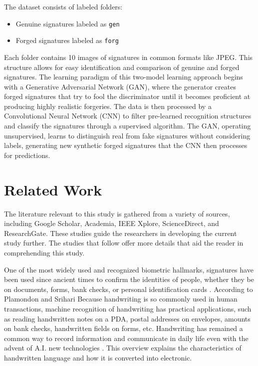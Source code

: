\documentclass[12pt]{article}
\begin{document}
The dataset consists of labeled folders:
\begin{itemize}
    \item Genuine signatures labeled as \texttt{gen}
    \item Forged signatures labeled as \texttt{forg}
\end{itemize}
Each folder contains 10 images of signatures in common formats like JPEG. This structure allows for easy identification and comparison of genuine and forged signatures. The learning paradigm of this two-model learning approach begins with a Generative Adversarial Network (GAN), where the generator creates forged signatures that try to fool the discriminator until it becomes proficient at producing highly realistic forgeries. The data is then processed by a Convolutional Neural Network (CNN) to filter pre-learned recognition structures and classify the signatures through a supervised algorithm. The GAN, operating unsupervised, learns to distinguish real from fake signatures without considering labels, generating new synthetic forged signatures that the CNN then processes for predictions.

\section{Related Work}

The literature relevant to this study is gathered from a variety of sources, including Google Scholar, Academia, IEEE Xplore, ScienceDirect, and ResearchGate. These studies guide the researchers in developing the current study further. The studies that follow offer more details that aid the reader in comprehending this study.

One of the most widely used and recognized biometric hallmarks, signatures have been used since ancient times to confirm the identities of people, whether they be on documents, forms, bank checks, or personal identification cards  \cite{ref5}. According to Plamondon and Srihari Because handwriting is so commonly used in human transactions, machine recognition of handwriting has practical applications, such as reading handwritten notes on a PDA, postal addresses on envelopes, amounts on bank checks, handwritten fields on forms, etc. Handwriting has remained a common way to record information and communicate in daily life even with the advent of A.I. new technologies \cite{ref10}. This overview explains the characteristics of handwritten language and how it is converted into electronic. 
\end{document}
